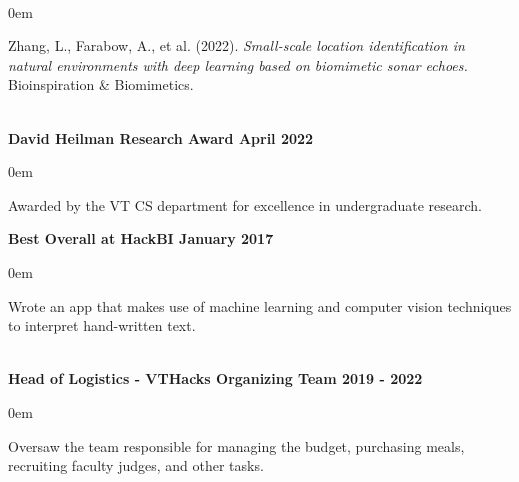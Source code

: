 \documentclass{article}
\begin{document}
\begin{center}
\begin{flushleft}
    {\large\textbf{\underline{}}} \\
    \begin{compactitem}
      \itemsep0em
      \item Zhang, L., Farabow, A., et al. (2022). \emph{Small-scale location identification in natural environments with deep learning based on biomimetic sonar echoes.} Bioinspiration \& Biomimetics. \\
    \end{compactitem}

    {\large\textbf{\underline{}}} \\
    \textbf{David Heilman Research Award \hfill April 2022}
    \begin{compactitem}
      \itemsep0em
      \item Awarded by the VT CS department for excellence in undergraduate research.
    \end{compactitem}

    \textbf{Best Overall at HackBI \hfill January 2017}
    \begin{compactitem}
      \itemsep0em
      \item Wrote an app that makes use of machine learning and computer vision techniques to interpret hand-written text.
    \end{compactitem}


    {\large\textbf{\underline{}}} \\

    \textbf{Head of Logistics - VTHacks Organizing Team \hfill 2019 - 2022}
    \begin{compactitem}
      \itemsep0em
      \item Oversaw the team responsible for managing the budget, purchasing meals, recruiting faculty judges, and other tasks.
    \end{compactitem}


\end{flushleft}
\end{center}
\end{document}
